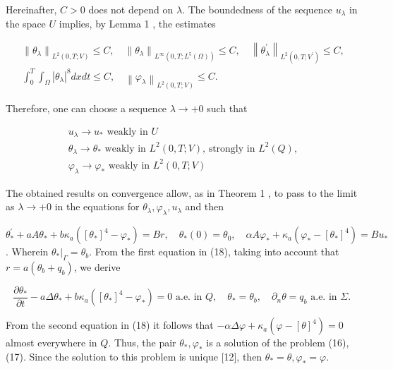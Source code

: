 Hereinafter, $C>0$ does not depend on $\lambda$. The boundedness of the sequence $u_{\lambda}$ in the space $U$ implies, by Lemma 1 , the estimates

$$
\begin{gathered}
\left\|\theta_{\lambda}\right\|_{L^{2}(0, T ; V)} \leq C, \quad\left\|\theta_{\lambda}\right\|_{L^{\infty}\left(0, T ; L^{5}(\Omega)\right)} \leq C, \quad\left\|\theta_{\lambda}^{\prime}\right\|_{L^{2}\left(0, T ; V^{\prime}\right)} \leq C, \\
\int_{0}^{T} \int_{\Omega}\left|\theta_{\lambda}\right|^{8} d x d t \leq C, \quad\left\|\varphi_{\lambda}\right\|_{L^{2}(0, T ; V)} \leq C .
\end{gathered}
$$

Therefore, one can choose a sequence $\lambda \rightarrow+0$ such that

$$
\begin{gathered}
u_{\lambda} \rightarrow u_{*} \text { weakly in } U \\
\theta_{\lambda} \rightarrow \theta_{*} \text { weakly in } L^{2}(0, T ; V) \text {, strongly in } L^{2}(Q), \\
\varphi_{\lambda} \rightarrow \varphi_{*} \text { weakly in } L^{2}(0, T ; V)
\end{gathered}
$$

The obtained results on convergence allow, as in Theorem 1 , to pass to the limit as $\lambda \rightarrow+0$ in the equations for $\theta_{\lambda}, \varphi_{\lambda}, u_{\lambda}$ and then

$\theta_{*}^{\prime}+a A \theta_{*}+b \kappa_{a}\left(\left[\theta_{*}\right]^{4}-\varphi_{*}\right)=B r, \quad \theta_{*}(0)=\theta_{0}, \quad \alpha A \varphi_{*}+\kappa_{a}\left(\varphi_{*}-\left[\theta_{*}\right]^{4}\right)=B u_{*}$. Wherein $\left.\theta_{*}\right|_{\Gamma}=\theta_{b}$. From the first equation in (18), taking into account that $r=a\left(\theta_{b}+q_{b}\right)$, we derive

$$
\frac{\partial \theta_{*}}{\partial t}-a \Delta \theta_{*}+b \kappa_{a}\left(\left[\theta_{*}\right]^{4}-\varphi_{*}\right)=0 \text { a.e. in } Q, \quad \theta_{*}=\theta_{b}, \quad \partial_{n} \theta=q_{b} \text { a.e. in } \Sigma \text {. }
$$

From the second equation in (18) it follows that $-\alpha \Delta \varphi+\kappa_{a}\left(\varphi-[\theta]^{4}\right)=0$ almost everywhere in $Q$. Thus, the pair $\theta_{*}, \varphi_{*}$ is a solution of the problem (16), (17). Since the solution to this problem is unique [12], then $\theta_{*}=\theta, \varphi_{*}=\varphi$.

